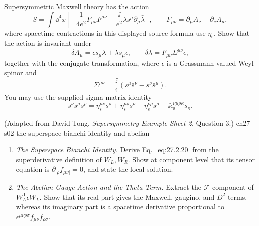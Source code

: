 \begin{enumerate}
  Supersymmetric Maxwell theory has the action
  \[
    S=\int \dd^4x\left[
      -\frac1{4e^2}F_{\mu\nu}F^{\mu\nu}
      -\frac{\ii}{e^2}\lambda s^\mu\partial_\mu\bar\lambda
    \right],
    \qquad
    F_{\mu\nu}=\partial_\mu A_\nu-\partial_\nu A_\mu,
  \]
  where spacetime contractions in this displayed source formula use
  \(\eta_{\mathrm s}\).  Show that the action is invariant under
  \[
    \delta A_\mu=\epsilon s_\mu\bar\lambda
                   +\lambda s_\mu\bar\epsilon,
    \qquad
    \delta\lambda=F_{\mu\nu}\Sigma^{\mu\nu}\epsilon,
  \]
  together with the conjugate transformation, where \(\epsilon\) is a
  Grassmann-valued Weyl spinor and
  \[
    \Sigma^{\mu\nu}=\frac{\ii}{4}
       (s^\mu\bar s^\nu-s^\nu\bar s^\mu).
  \]
  You may use the supplied sigma-matrix identity
  \[
    s^\nu\bar s^\mu s^\rho
      =\eta_{\mathrm s}^{\mu\nu}s^\rho
       +\eta_{\mathrm s}^{\mu\rho}s^\nu
       -\eta_{\mathrm s}^{\nu\rho}s^\mu
       +\ii\epsilon_{\mathrm s}^{\nu\mu\rho\kappa}s_\kappa.
  \]

    {(Adapted from David Tong, \emph{Supersymmetry Example Sheet 2}, Question 3.)}
    {ch27-s02-the-superspace-bianchi-identity-and-abelian}
  \begin{enumerate}
    \item \emph{The Superspace Bianchi Identity.}
    Derive Eq.~\eqref{eq:27.2.20} from the superderivative definition of
      \(W_L,W_R\).  Show at component level that its tensor equation is
      \(\partial_{[\rho}f_{\mu\nu]}=0\), and state the local solution.
    \item \emph{The Abelian Gauge Action and the Theta Term.}
    Extract the \(\mathcal F\)-component of
      \(W_L^{\mathsf T}\epsilon W_L\).  Show that its real part gives the Maxwell,
      gaugino, and \(D^2\) terms, whereas its imaginary part is a spacetime
      derivative proportional to
      \(\epsilon^{\mu\nu\rho\sigma}f_{\mu\nu}f_{\rho\sigma}\).
  \end{enumerate}


\end{enumerate}
